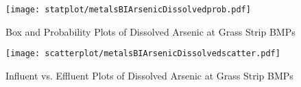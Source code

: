         \begin{figure}[hb]   %
            \centering
            \texttt{[image: statplot/metalsBIArsenicDissolvedprob.pdf]}
            \caption{Box and Probability Plots of Dissolved Arsenic at Grass Strip BMPs}
        \end{figure}         %
        
        
        \begin{figure}[hb]   %
            \centering
            \texttt{[image: scatterplot/metalsBIArsenicDissolvedscatter.pdf]}
            \caption{Influent vs. Effluent Plots of Dissolved Arsenic at Grass Strip BMPs}
        \end{figure}         %
        \clearpage
        